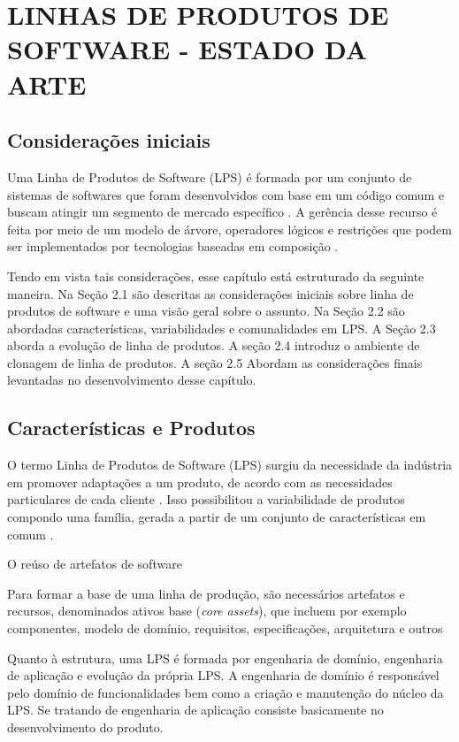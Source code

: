 \chapter{LINHAS DE PRODUTOS DE SOFTWARE - ESTADO DA ARTE}
\label{cap:lps}

\section{Considerações iniciais}

Uma Linha de Produtos de Software (LPS) é formada por um conjunto de sistemas de softwares que foram desenvolvidos com base em um código comum e buscam atingir um segmento de mercado específico \cite{apel2016feature}. A gerência desse recurso é feita por meio de um modelo de árvore, operadores lógicos e restrições que podem ser implementados por tecnologias baseadas em composição \cite{Vale2015}.


Tendo em vista tais considerações, esse capítulo está estruturado da seguinte maneira. Na Seção 2.1 são descritas as considerações iniciais sobre linha de produtos de software e uma visão geral sobre o assunto. Na Seção 2.2 são abordadas características, variabilidades e comunalidades em LPS. A Seção 2.3 aborda a evolução de linha de produtos. A seção 2.4 introduz o ambiente de clonagem de linha de produtos. A seção 2.5 Abordam as considerações finais levantadas no desenvolvimento desse capítulo.
	
\section{Características e Produtos}


O termo Linha de Produtos de Software (LPS) surgiu da necessidade da indústria em promover adaptações a um produto, de acordo com as necessidades particulares de cada cliente \cite{apel2016feature}. Isso possibilitou a variabilidade de produtos compondo uma família, gerada a partir de um conjunto de características em comum \cite{Laguna2013}. 

O reúso de artefatos de software 


{Para formar a base de uma linha de produção, são necessários artefatos e recursos, denominados ativos base (\textit{core assets}), que incluem por exemplo componentes, modelo de domínio, requisitos, especificações, arquitetura e outros}
 
Quanto à estrutura, uma LPS é formada por engenharia de domínio, engenharia de aplicação e evolução da própria LPS. A engenharia de domínio é responsável pelo domínio de funcionalidades bem como a criação e manutenção do núcleo da LPS. Se tratando de engenharia de aplicação consiste basicamente no desenvolvimento do produto. 



